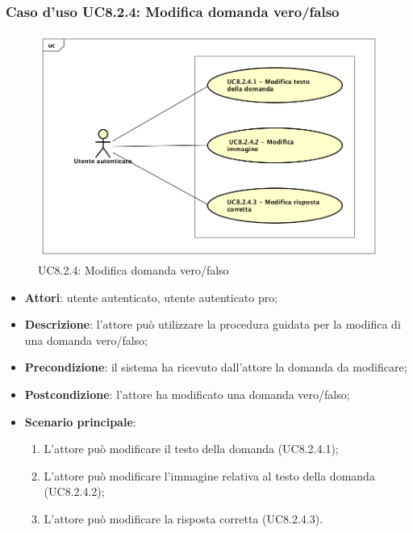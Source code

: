 \subsubsection{Caso d'uso UC8.2.4: Modifica domanda vero/falso}
	\label{UC8.2.4}
	\begin{figure}[h]
		\centering
			\includegraphics[scale=0.45,keepaspectratio]{UML/UC8_2_4.png}
		\caption{UC8.2.4: Modifica domanda vero/falso}
	\end{figure}
	\FloatBarrier
	\begin{itemize}
		\item
			\textbf{Attori}: utente autenticato, utente autenticato pro;
		\item		
			\textbf{Descrizione}: l'attore può utilizzare la procedura guidata per la modifica di una domanda vero/falso;
		\item
			\textbf{Precondizione}: il sistema ha ricevuto dall'attore la domanda da modificare;  
		\item
			\textbf{Postcondizione}: l'attore ha modificato una domanda vero/falso;
		\item
			\textbf{Scenario principale}:
	       		\begin{enumerate}
	       			\item
	       			L'attore può modificare il testo della domanda (UC8.2.4.1);
	       			\item
	       			L'attore può modificare l'immagine relativa al testo della domanda (UC8.2.4.2);
					\item
					L'attore può modificare la risposta corretta (UC8.2.4.3).
	 			\end{enumerate}
	\end{itemize}
	
